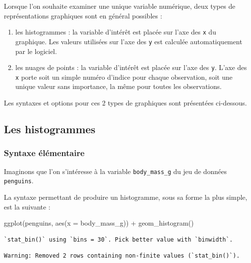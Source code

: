 \documentclass[
  a4paper,
  DIV=11,
  numbers=noendperiod,
  oneside]{scrreprt}
\newenvironment{Shaded}{}{}
\newcommand{\AttributeTok}[1]{\textcolor[rgb]{0.84,0.23,0.29}{#1}}
\newcommand{\FunctionTok}[1]{\textcolor[rgb]{0.44,0.26,0.76}{#1}}
\newcommand{\NormalTok}[1]{\textcolor[rgb]{0.14,0.16,0.18}{#1}}
\newcommand{\SpecialCharTok}[1]{\textcolor[rgb]{0.00,0.36,0.77}{#1}}
\providecommand{\tightlist}{%
  \setlength{\itemsep}{0pt}\setlength{\parskip}{0pt}}\usepackage{longtable,booktabs,array}
\begin{document}
Lorsque l'on souhaite examiner une unique variable numérique, deux types
de représentations graphiques sont en général possibles :

\begin{enumerate}
\def\labelenumi{\arabic{enumi}.}
\tightlist
\item
  les histogrammes : la variable d'intérêt est placée sur l'axe des
  \texttt{x} du graphique. Les valeurs utilisées sur l'axe des
  \texttt{y} est calculée automatiquement par le logiciel.
\item
  les nuages de points : la variable d'intérêt est placée sur l'axe des
  \texttt{y}. L'axe des \texttt{x} porte soit un simple numéro d'indice
  pour chaque observation, soit une unique valeur sans importance, la
  même pour toutes les observations.
\end{enumerate}

Les syntaxes et options pour ces 2 types de graphiques sont présentées
ci-dessous.

\subsection{Les histogrammes}\label{les-histogrammes}

\subsubsection{Syntaxe élémentaire}\label{syntaxe-uxe9luxe9mentaire}

Imaginons que l'on s'intéresse à la variable \texttt{body\_mass\_g} du
jeu de données \texttt{penguins}.

La syntaxe permettant de produire un histogramme, sous sa forme la plus
simple, est la suivante :

\begin{Shaded}
\begin{Highlighting}[]
\FunctionTok{ggplot}\NormalTok{(penguins, }\FunctionTok{aes}\NormalTok{(}\AttributeTok{x =}\NormalTok{ body\_mass\_g)) }\SpecialCharTok{+}
  \FunctionTok{geom\_histogram}\NormalTok{()}
\end{Highlighting}
\end{Shaded}

\begin{verbatim}
`stat_bin()` using `bins = 30`. Pick better value with `binwidth`.
\end{verbatim}

\begin{verbatim}
Warning: Removed 2 rows containing non-finite values (`stat_bin()`).
\end{verbatim}
\end{document}
